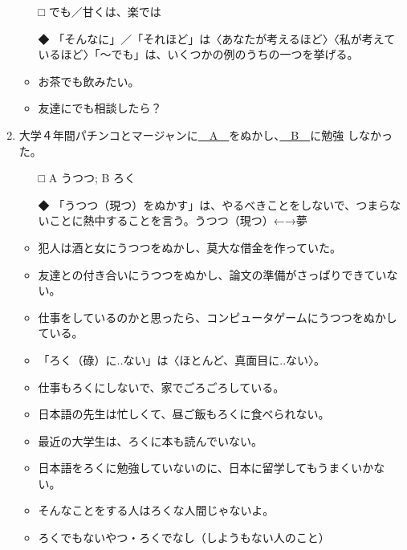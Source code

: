 \documentclass[
uplatex,
b5paper,
10pt,
dvipdfmx
]{jsbook}
\begin{document}
\begin{enumerate}
\begin{itemize}
\item[□] でも／甘くは、楽では
\item[◆] 「そんなに」／「それほど」は〈あなたが考えるほど〉〈私が考えて
	  いるほど〉「〜でも」は、いくつかの例のうちの一つを挙げる。
\end{itemize}
\begin{itemize}
 \item お茶でも飲みたい。
 \item 友達にでも相談したら？
\end{itemize}

\item 大学４年間パチンコとマージャンに\underline{　A　}をぬかし、\underline{　B　}に勉強
      しなかった。

\begin{itemize}
\item[□] A うつつ; B ろく
\item[◆] 「うつつ（現つ）をぬかす」は、やるべきことをしないで、つまらな
	  いことに熱中することを言う。うつつ（現つ）←→夢
\end{itemize}
\begin{itemize}
 \item 犯人は酒と女にうつつをぬかし、莫大な借金を作っていた。
 \item 友達との付き合いにうつつをぬかし、論文の準備がさっぱりできていない。
 \item 仕事をしているのかと思ったら、コンピュータゲームにうつつをぬかしている。
\end{itemize}
\begin{itemize}
 \item 「ろく（碌）に..ない」は〈ほとんど、真面目に..ない〉。
\end{itemize}
\begin{itemize}
 \item 仕事もろくにしないで、家でごろごろしている。
 \item 日本語の先生は忙しくて、昼ご飯もろくに食べられない。
 \item 最近の大学生は、ろくに本も読んでいない。
 \item 日本語をろくに勉強していないのに、日本に留学してもうまくいかない。
\end{itemize}
\begin{itemize}
 \item そんなことをする人はろくな人間じゃないよ。
 \item ろくでもないやつ・ろくでなし（しようもない人のこと）
\end{itemize}


\end{enumerate}
\end{document}
